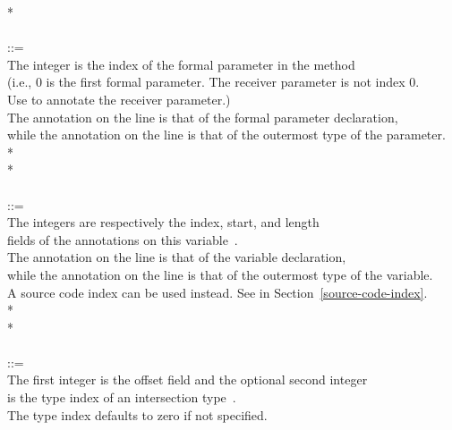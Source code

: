 \documentclass{article}
\begin{document}
\begin{tabbing}
\qquad    {}* \\
\\
 ::= \\
\qquad    \bnfcmt The integer is the index of the formal parameter in the method \\
\qquad    \bnfcmt (i.e., 0 is the first formal parameter. The receiver parameter is not index 0. \\
\qquad    \bnfcmt Use  to annotate the receiver parameter.) \\
\qquad    \bnfcmt The annotation on the  line is that of the formal parameter declaration, \\
\qquad    \bnfcmt while the annotation on the  line is that of the outermost type of the parameter. \\
\qquad    {}  \bnflit{:} * \lineend \\
\qquad    {}* \\
\\
 ::= \\
\qquad    \bnfcmt The integers are respectively the index, start, and length \\
\qquad    \bnfcmt fields of the annotations on this variable~\cite{JSR308}. \\
\qquad    \bnfcmt The annotation on the  line is that of the variable declaration, \\
\qquad    \bnfcmt while the annotation on the  line is that of the outermost type of the variable. \\
\qquad    \bnfcmt A source code index can be used instead. See  in Section~\ref{source-code-index}. \\
\qquad    {}  \bnflit{\#}  \bnflit{+}  \bnflit{:} * \lineend \\
\qquad    {}* \\
\\
 ::= \\
\qquad    \bnfcmt The first integer is the offset field and the optional second integer\\
\qquad    \bnfcmt is the type index of an intersection type~\cite{JSR308}. \\
\qquad    \bnfcmt The type index defaults to zero if not specified. \\

\end{tabbing}
\end{document}
